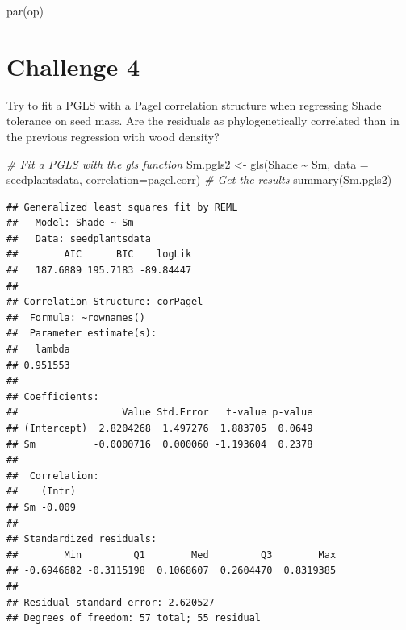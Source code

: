 \documentclass[
]{book}
\newenvironment{Shaded}{\begin{snugshade}}{\end{snugshade}}
\newcommand{\AttributeTok}[1]{\textcolor[rgb]{0.77,0.63,0.00}{#1}}
\newcommand{\CommentTok}[1]{\textcolor[rgb]{0.56,0.35,0.01}{\textit{#1}}}
\newcommand{\FunctionTok}[1]{\textcolor[rgb]{0.00,0.00,0.00}{#1}}
\newcommand{\NormalTok}[1]{#1}
\newcommand{\OtherTok}[1]{\textcolor[rgb]{0.56,0.35,0.01}{#1}}
\newcommand{\SpecialCharTok}[1]{\textcolor[rgb]{0.00,0.00,0.00}{#1}}
\begin{document}
\begin{Shaded}
\begin{Highlighting}[]
\FunctionTok{par}\NormalTok{(op)}
\end{Highlighting}
\end{Shaded}

\hypertarget{challenge-4-1}{%
\section{Challenge 4}\label{challenge-4-1}}

Try to fit a PGLS with a Pagel correlation structure when regressing Shade tolerance on seed mass. Are the residuals as phylogenetically correlated than in the previous regression with wood density?

\begin{Shaded}
\begin{Highlighting}[]
\CommentTok{\# Fit a PGLS with the gls function}
\NormalTok{Sm.pgls2 }\OtherTok{\textless{}{-}} \FunctionTok{gls}\NormalTok{(Shade }\SpecialCharTok{\textasciitilde{}}\NormalTok{ Sm, }\AttributeTok{data =}\NormalTok{ seedplantsdata, }\AttributeTok{correlation=}\NormalTok{pagel.corr)}
\CommentTok{\# Get the results}
\FunctionTok{summary}\NormalTok{(Sm.pgls2)}
\end{Highlighting}
\end{Shaded}

\begin{verbatim}
## Generalized least squares fit by REML
##   Model: Shade ~ Sm 
##   Data: seedplantsdata 
##        AIC      BIC    logLik
##   187.6889 195.7183 -89.84447
## 
## Correlation Structure: corPagel
##  Formula: ~rownames() 
##  Parameter estimate(s):
##   lambda 
## 0.951553 
## 
## Coefficients:
##                  Value Std.Error   t-value p-value
## (Intercept)  2.8204268  1.497276  1.883705  0.0649
## Sm          -0.0000716  0.000060 -1.193604  0.2378
## 
##  Correlation: 
##    (Intr)
## Sm -0.009
## 
## Standardized residuals:
##        Min         Q1        Med         Q3        Max 
## -0.6946682 -0.3115198  0.1068607  0.2604470  0.8319385 
## 
## Residual standard error: 2.620527 
## Degrees of freedom: 57 total; 55 residual
\end{verbatim}

  
\end{document}
